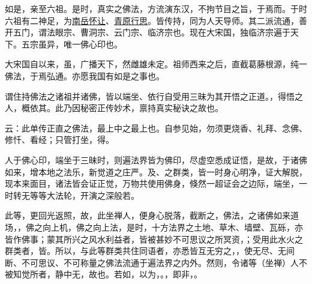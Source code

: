 如是，亲至六祖。是时，真实之佛法，方流演东汉，不拘节目之旨，于焉而。于时六祖有二神足，为\uline{南岳怀让}、\uline{青原行思}。皆传持，同为人天导师。其二派流通，善开五门，谓法眼宗、曹洞宗、云门宗、临济宗也。现在大宋国，独临济宗遍于天下。五宗虽异，唯一佛心印也。

大宋国自以来，虽，广播天下，然雌雄未定。祖师西来之后，直截葛藤根源，纯一佛法，于焉弘通。亦愿我国有如是之事也。

谓住持佛法之诸祖并诸佛，皆以端坐、依行自受用三昧为其开悟之正道。，得悟之人，概依其。此乃因秘密正传妙术，禀持真实秘诀之故也。

云：此单传正直之佛法，最上中之最上也。自参见始，勿须更烧香、礼拜、念佛、修忏、看经；只管打坐，得。

人于佛心印，端坐于三昧时，则遍法界皆为佛印，尽虚空悉成证悟，是故，于诸佛如来，增本地之法乐，新觉道之庄严。及、之群类，皆一时身心明净，证大解脱，现本来面目，诸法皆会证正觉，万物共使用佛身，倏然一超证会之边际，端坐，一时转无等等大法轮，开演之深般若。

此等，更回光返照，故，此坐禅人，便身心脱落，截断之，佛法，之诸佛如来道场，，佛之向上机，佛之向上法，是时，十方法界之土地、草木、墙壁、瓦砾，亦皆作佛事；蒙其所兴之风水利益者，皆被甚妙不可思议之所冥资，；受用此水火之群类者，皆。所以，与此等群类共住同语者，亦悉皆互无穷之，，使无尽、无间断、不可思议、不可称量之佛法流通于遍法界之内外。然则，令诸等（坐禅）人不被知觉所者，静中无，故也。若如，以为，。，即非，。
